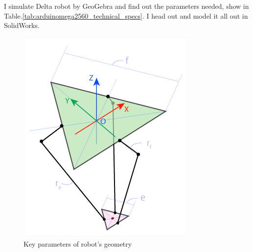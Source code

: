I simulate Delta robot by GeoGebra and find out the parameters needed, show in Table.\ref{tab:arduinomega2560_technical_specs}. I head out and model it all out in SolidWorks.
\begin{figure}[H]
	\centering
	\includegraphics[width=\maxwidth{15cm}, keepaspectratio]{Chapters/Fig/key_parameters.png}
	\caption{Key parameters of robot's geometry}
	\label{fig:key_parameters}
\end{figure}

